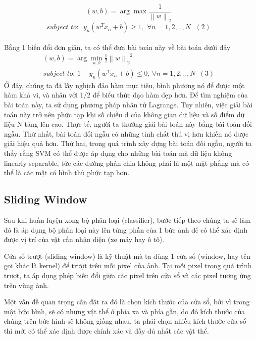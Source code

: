 \documentclass[10pt,conference,a4paper]{IEEEtran}
\begin{document}
\[\left( {w,b} \right) = \arg \max \frac{1}{{{{\left\| w \right\|}_2}}}\]
\[subject\,\,to:\,\,\,{y_n}\left( {{w^T}{x_n} + b} \right) \ge 1,\,\,\forall n = 1,2,..,N\,\,\,\,\left( 2 \right)\]\\
Bằng 1 biến đổi đơn giản, ta có thể đưa bài toán này về bài toán dưới đây
\[\begin{array}{l}
\left( {w,b} \right) = \arg \mathop {\min }\limits_{w,b} \frac{1}{2}{\left\| w \right\|_2}^2\\
subject\,\,to:\,1 - {y_n}\left( {{w^T}{x_n} + b} \right) \le 0,\,\forall n = 1,2,..,N\,\,\,\left( 3 \right)
\end{array}\]
Ở đây, chúng ta đã lấy nghịch đảo hàm mục tiêu, bình phương nó để được một hàm khả vi, và nhân với 1/2 để biểu thức đạo hàm đẹp hơn.
Để tìm nghiệm của bài toán này, ta sử dụng phương pháp nhân tử Lagrange. Tuy nhiên, việc giải bài toán này trở nên phức tạp khi số chiều d của không gian dữ liệu và số điểm dữ liệu N tăng lên cao. Thực tế, người ta thường giải bài toán này bằng bài toán đối ngẫu. Thứ nhất, bài toán đối ngẫu có những tính chất thú vị hơn khiến nó được giải hiệu quả hơn. Thứ hai, trong quá trình xây dựng bài toán đối ngẫu, người ta thấy rằng SVM có thể được áp dụng cho những bài toán mà dữ liệu không linearly separable, tức các đường phân chia không phải là một mặt phẳng mà có thể là các mặt có hình thù phức tạp hơn.



\subsection{Sliding Window}
Sau khi huấn luyện xong bộ phân loại (classifier), bước tiếp theo chúng ta sẽ làm đó là áp dụng bộ phân loại này lên từng phần của 1 bức ảnh để có thể xác định được vị trí của vật cần nhận diện (xe máy hay ô tô). \cite{harveen}

Cửa sổ trượt (sliding window) là kỹ thuật mà ta dùng 1 cửa sổ (window, hay tên gọi khác là kernel) để trượt trên mỗi pixel của ảnh. Tại mỗi pixel trong quá trình trượt, ta áp dụng phép biến đổi giữa các pixel trên cửa sổ và các pixel tương ứng trên vùng ảnh.

Một vấn đề quan trọng cần đặt ra đó là chọn kích thước của cửa sổ, bởi vì trong một bức hình, sẽ có những vật thể ở phía xa và phía gần, do đó kích thước của chúng trên bức hình sẽ không giống nhau, ta phải chọn nhiều kích thước cửa sổ thì mới có thể xác định được chính xác và đầy đủ nhất các vật thể.
\end{document}
